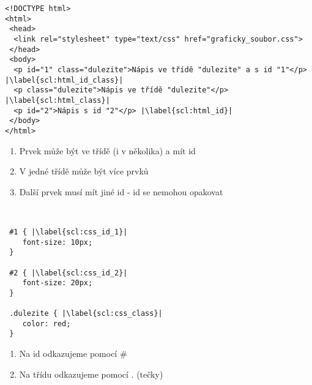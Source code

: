 \begin{minipage}[t]{.45\textwidth}
\begin{code}
\begin{verbatim}
<!DOCTYPE html> 
<html> 
 <head> 
  <link rel="stylesheet" type="text/css" href="graficky_soubor.css"> 
 </head> 
 <body> 
  <p id="1" class="dulezite">Nápis ve třídě "dulezite" a s id "1"</p> |\label{scl:html_id_class}|
  <p class="dulezite">Nápis ve třídě "dulezite"</p> |\label{scl:html_class}|
  <p id="2">Nápis s id "2"</p> |\label{scl:html_id}|
 </body>
</html>
\end{verbatim}

\label{code:html_id_class}
\end{code}
\end{minipage}
\begin{minipage}[t]{.45\textwidth}
\begin{enumerate}
\vspace{-0.4cm}
\item[ř. \ref{scl:html_id_class}:] Prvek může být ve třídě (i v několika) a mít id
\item[ř. \ref{scl:html_class}:] V jedné třídě může být více prvků
\item[ř. \ref{scl:html_id}:] Další prvek musí mít jiné id - id se nemohou opakovat
\end{enumerate}
\end{minipage}\\

\begin{minipage}[t]{.45\textwidth}
\begin{code}
\begin{verbatim}
 #1 { |\label{scl:css_id_1}|
	font-size: 10px; 
 }
 
 #2 { |\label{scl:css_id_2}|
	font-size: 20px;
 }
 
 .dulezite { |\label{scl:css_class}|
	color: red; 
 }
\end{verbatim}

\label{code:html_id_class}
\end{code}
\end{minipage}
\begin{minipage}[t]{.45\textwidth}
\begin{enumerate}
\vspace{-0.4cm}
\item[ř. \ref{scl:css_id_1}, \ref{scl:css_id_2}:] Na id odkazujeme pomocí \#
\item[ř. \ref{scl:css_class}:] Na třídu odkazujeme pomocí . (tečky)
\end{enumerate}
\end{minipage}\\

